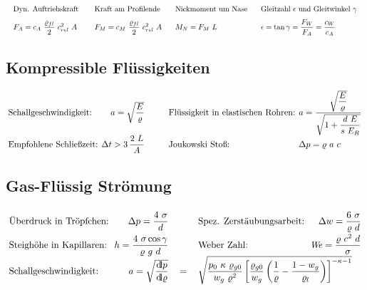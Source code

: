 	\[\arraycolsep=0.9em %
		\begin{array}{llll}
			\text{Dyn. Auftriebskraft }                          & \text{Kraft am Profilende}                           & \text{Nickmoment um Nase} & \text{Gleitzahl } \epsilon \text{ und Gleitwinkel } \gamma  \\
			F_A = c_A\ \dfrac{{\varrho}_{fl}} {2}\ c_{rel}^2 \ A & F_M = c_M\ \dfrac{{\varrho}_{fl}} {2}\ c_{rel}^2 \ A & M_N = F_M\ L              & \epsilon = \tan\gamma = \dfrac{F_W}{F_A} = \dfrac{c_W}{c_A}
		\end{array} \]

\subsection{Kompressible Flüssigkeiten}
	\skipabove{-25pt}
	\[\arraycolsep=0.2em \def\arraystretch{1.5}
	\begin{array}{lr p{2em} ll}
		\text{Schallgeschwindigkeit:}  & a = \sqrt{\dfrac{E}{\varrho}}  &  & \text{Flüssigkeit in elastischen Rohren:} & a = \dfrac{\sqrt{\dfrac{E}{\varrho}}} {\sqrt{1+ \dfrac{d\ E}{s\ E_R}}} \\
		\text{Empfohlene Schließzeit:} & \Delta t > 3\, \dfrac{2\ L}{A} &  & \text{Joukowski Stoß:}                    & \Delta p = \varrho\ a\ c
	\end{array} \]

\subsection{Gas-Flüssig Strömung}
	\setlength{\abovedisplayshortskip}{-20pt}
	\[\arraycolsep=0.3em \def\arraystretch{2}
	\begin{array}{lrclr}
		\text{Überdruck in Tröpfchen:}  & \Delta p = \dfrac{4\ \sigma}{d}                 & \text{\qquad} & \text{Spez. Zerstäubungsarbeit:} & \Delta w = \dfrac{6\ \sigma}{\varrho\ d} \\
		\text{Steighöhe in Kapillaren:} & h =  \dfrac{4\ \sigma\cos\gamma}{\varrho\ g\ d} & \text{\qquad} & \text{Weber Zahl:}               & \Webe = \dfrac{\varrho\ c^2\ d}{\sigma}  \\
		\text{Schallgeschwindigkeit:}   & a = \sqrt{\dfrac{\dd p}{\dd \varrho}}           & = &\multicolumn{2}{l}{ \sqrt{\dfrac{p_0\ \kappa\ \varrho_{g0}}{w_g\ \varrho^2}   \left[\dfrac{\varrho_{g0}}{w_g}  \left(\dfrac{1}{\varrho} - \dfrac{1-w_g}{\varrho_l}\right)\right] ^ {-\kappa-1}} }
	\end{array} \]
